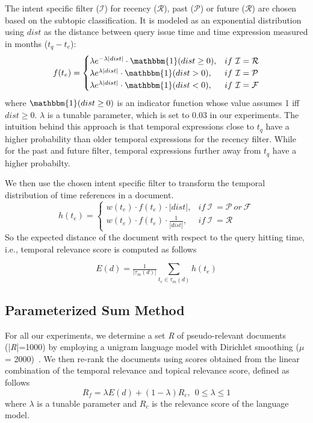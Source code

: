 \documentclass{sig-alternate}
\begin{document}
The intent specific filter ($\mathcal I$) for recency ($\mathcal R$), past ($\mathcal P$) or future ($\mathcal R$) are chosen based on the subtopic classification. It is modeled as an exponential distribution using $dist$ as the distance between query issue time and time expression measured in months ($t_{q} - t_{e}$):
\begin{equation}\label{eq:4}
f(t_{e}) = \begin{cases}
                     \lambda e^{-\lambda |dist|} \cdot \mathbbm{1}(dist \geq 0), & if\ \mathcal I = \mathcal R\\
                     \lambda e^{\lambda |dist|} \cdot \mathbbm{1}(dist > 0), & if\ \mathcal I = \mathcal P\\
                     \lambda e^{\lambda |dist|} \cdot \mathbbm{1}(dist < 0), & if\ \mathcal I = \mathcal F
              \end{cases}
\end{equation}
where $\mathbbm{1}(dist \geq 0)$ is an indicator function whose value assumes 1 iff $dist \geq 0$. $\lambda$ is a tunable parameter, which is set to 0.03 in our experiments. The intuition behind this approach is that temporal expressions close to $t_{q}$ have a higher probability than older temporal expressions for the recency filter. While for the past and future filter, temporal expressions further away from $t_{q}$ have a higher probabilty. 

We then use the chosen intent specific filter to transform the temporal distribution of time references in a document.
\begin{equation}\label{eq:5}
h(t_{e}) = \begin{cases}
              w(t_{e}) \cdot f(t_{e}) \cdot |dist|, & if\ \mathcal I\ = \mathcal P\ or\ \mathcal F\\
              w(t_{e}) \cdot f(t_{e}) \cdot \frac{1}{|dist|}, & if\ \mathcal I\ = \mathcal R
           \end{cases}
\end{equation}
So the expected distance of the document with respect to the query hitting time, i.e., temporal relevance score is computed as follows

\begin{equation}\label{eq:6}
       E(d) = \tfrac{1}{|\tau_{m}(d)|}\sum\limits_{t_{e} \in \tau_{m}(d)}h(t_{e})
\end{equation}
\subsection{Parameterized Sum Method}\label{linear_comb}
 For all our experiments, we determine a set \textit{R} of pseudo-relevant documents (|\textit{R}|=1000) by employing a unigram language model with Dirichlet smoothing ($\mu$ = 2000)~\cite{lm}. We then re-rank the documents using scores obtained from the linear combination of the temporal relevance and topical relevance score, defined as follows
 \begin{equation}\label{eq:7}
 R_{f} = \lambda E(d) + (1 - \lambda) R_{c}, \ \ 0 \leq \lambda \leq 1
 \end{equation}
where $\lambda$ is a tunable parameter and $R_{c}$ is the relevance score of the language model.
\end{document}
